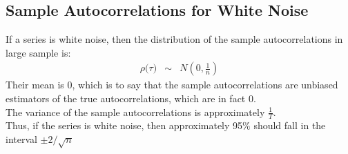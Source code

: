\subsection{Sample Autocorrelations for White Noise}
If a series is white noise, then the distribution of the sample autocorrelations in large sample is:
\begin{eqnarray}
    \label{Eq:AutocorrelationDistribution}
	\rho\big(\tau\big) &\sim& N\left(0, \frac{1}{n}\right)
\end{eqnarray}
Their mean is 0, which is to say that the sample autocorrelations are unbiased estimators of the true autocorrelations, which are in fact 0.\\
The variance of the sample autocorrelations is approximately $\frac{1}{T}$.\\ 
Thus, if the series is white noise, then approximately 95$\%$ should fall in the interval $\pm2/\sqrt{n}$

